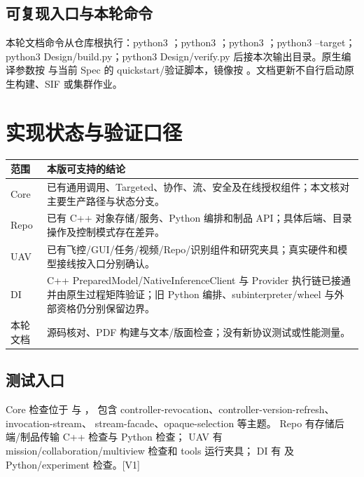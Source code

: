 \subsection{可复现入口与本轮命令}
本轮文档命令从仓库根执行：python3 ；python3 ；python3 ；python3  --target；python3 Design/build.py；python3 Design/verify.py 后接本次输出目录。原生编译参数按  与当前 Spec 的 quickstart/验证脚本，镜像按 。文档更新不自行启动原生构建、SIF 或集群作业。

\newpage

\section{实现状态与验证口径}
\begin{tabularx}{\linewidth}{@{}p{27mm}X@{}}
\toprule
范围 & 本版可支持的结论 \\
\midrule
Core & 已有通用调用、Targeted、协作、流、安全及在线授权组件；本文核对主要生产路径与状态分支。\\
Repo & 已有 C++ 对象存储/服务、Python 编排和制品 API；具体后端、目录操作及控制模式存在差异。\\
UAV & 已有飞控/GUI/任务/视频/Repo/识别组件和研究夹具；真实硬件和模型接线按入口分别确认。\\
DI & C++ PreparedModel/NativeInferenceClient 与 Provider 执行链已接通并由原生过程矩阵验证；旧 Python 编排、subinterpreter/wheel 与外部资格仍分别保留边界。\\
本轮文档 & 源码核对、PDF 构建与文本/版面检查；没有新协议测试或性能测量。\\
\bottomrule
\end{tabularx}

\subsection{测试入口}
Core 检查位于  与 ，
包含 controller-revocation、controller-version-refresh、invocation-stream、
stream-facade、opaque-selection 等主题。
Repo 有存储后端/制品传输 C++ 检查与  Python 检查；
UAV 有 mission/collaboration/multiview 检查和 tools 运行夹具；
DI 有  及 Python/experiment 检查。[V1]

